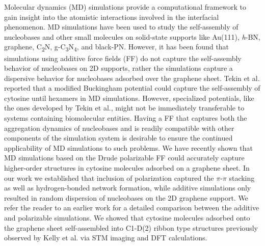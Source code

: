 Molecular dynamics (MD) simulations provide a computational framework to gain insight into the atomistic interactions involved in the interfacial phenomenon. MD simulations have been used to study the self-assembly of nucleobases and other small molecules on solid-state supports like Au(111),\supercite{rapino_modeling_2005, maleki_molecular_2011, rosa_enthalpyentropy_2014} \textit{h}-BN,\supercite{ding_adsorption_2013, saikia_polarity-induced_2018} graphene,\supercite{saikia_hierarchical_2017, saikia_dynamics_2018} C\textsubscript{2}N,\supercite{mukhopadhyay_gauging_2018, mukhopadhyay_screening_2020} g-C\textsubscript{3}N\textsubscript{4},\supercite{mukhopadhyay_delicate_2020} and black-PN.\supercite{mukhopadhyay_design_2018}  However, it has been found that simulations using additive force fields (FF) do not capture the self-assembly behavior of nucleobases on 2D supports, rather the simulations capture a dispersive behavior for nucleobases adsorbed over the graphene sheet.\supercite{saikia_dynamics_2018} Tekin et al. reported that a modified Buckingham potential could capture the self-assembly of cytosine until hexamers in MD simulations.\supercite{manukyan_first_2015} However, specialized potentials, like the ones developed by Tekin et al., might not be immediately transferable to systems containing biomolecular entities. Having a FF that captures both the aggregation dynamics of nucleobases and is readily compatible with other components of the simulation system is desirable to ensure the continued applicability of MD simulations to such problems. We have recently shown that MD simulations based on the Drude polarizable FF could accurately capture higher-order structures in cytosine molecules adsorbed on a graphene sheet.\supercite{h_polarization_2021} In our work we established that inclusion of polarization captured the $\pi$-$\pi$ stacking as well as hydrogen-bonded network formation, while additive simulations only resulted in random dispersion of nucleobases on the 2D graphene support. We refer the reader to an earlier work for a detailed comparison between the additive and polarizable simulations.\supercite{h_polarization_2021} We showed that cytosine molecules adsorbed onto the graphene sheet self-assembled into C1-D(2) ribbon type structures previously observed by Kelly et al. via STM imaging and DFT calculations.\supercite{kelly_understanding_2008}

